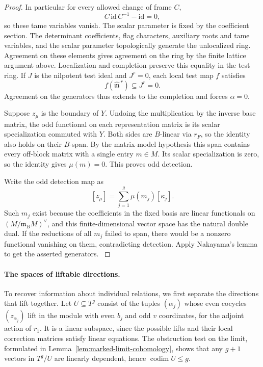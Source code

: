 \begin{proof}
In particular for every allowed change of frame \(C\),
\[
 C\,\mathrm{id}\,C^{-1}-\mathrm{id}=0,
\]
so these tame variables vanish. The scalar parameter is fixed by the coefficient
section. The determinant coefficients, flag characters,
auxiliary roots and tame variables, and the scalar
parameter topologically generate the unlocalized ring.
Agreement on these elements gives agreement on the ring
by the finite lattice argument above. Localization and
completion preserve this equality in the test ring.
If \(J\) is the nilpotent test ideal and \(J^r=0\), each local test map \(f\) satisfies 
\[
 f(\widehat{\mathfrak m}^{\,r})\subseteq J^r=0.
\]
 Agreement on the generators thus extends to the completion and forces \(\alpha=0\).  \label{cor:ordinary-patching-cotangent-8}

Suppose \(z_\mu\) is the boundary of \(Y\).
Undoing the multiplication by the inverse base matrix, the
odd functional on each representation matrix is its scalar
specialization commuted with \(Y\). Both sides are \(B\)-linear
via \(r_F\), so the identity also holds on their \(B\)-span.
By the matrix-model hypothesis this span contains every
off-block matrix with a single entry \(m\in M\). Its scalar
specialization is zero, so the identity gives \(\mu(m)=0\).
This proves odd detection.

Write the odd detection map as
\[
 [z_\mu]=\sum_{j=1}^g \mu(m_j)[\kappa_j].
\]
Such \(m_j\) exist because the coefficients in the fixed basis
are linear functionals on \((M/\mathfrak m_BM)^\vee\), and
this finite-dimensional vector space has the natural double
dual. If the reductions of all \(m_j\) failed to span, there
would be a nonzero functional vanishing on them, contradicting
detection. Apply Nakayama's lemma to get the asserted generators.
\label{cor:ordinary-patching-cotangent-9}

\end{proof}

\paragraph{The spaces of liftable directions.}
To recover information about individual relations, we first separate the directions
that lift together. Let \(U\subseteq T^g\) consist of the tuples
\((\alpha_j)\) whose even cocycles \((z_{\alpha_j})\)
lift in the module with even \(b_j\) and odd \(v\)
coordinates, for the adjoint action of \(r_1\).
It is a linear subspace, since the possible lifts
and their local correction matrices satisfy linear equations.
The obstruction test on the limit, formulated in
Lemma~\ref{lem:marked-limit-cohomology}, shows that any
\(g+1\) vectors in \(T^g/U\) are linearly dependent, hence
\(\operatorname{codim}U\le g\).

